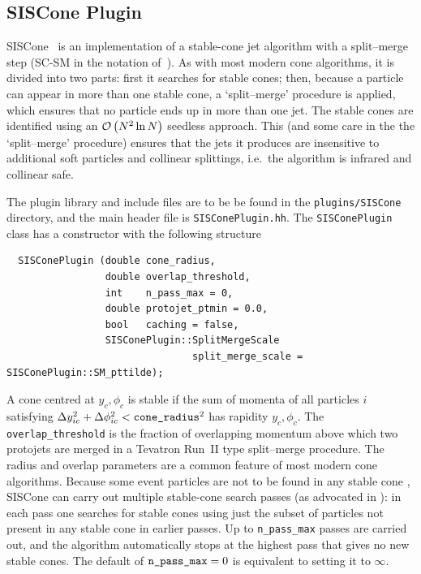 \documentclass[12pt,a4]{article}
\newcommand{\order}[1]{{\cal O}\left(#1\right)}
\begin{document}
\subsection{SISCone Plugin}
\label{sec:siscone-plugin}

SISCone~\cite{SISCone} is an implementation of a stable-cone jet
algorithm with a split--merge step (SC-SM in the notation
of~\cite{Salam:2009jx}).
%
As with most modern cone algorithms, it is divided into two parts:
first it searches for stable cones; then, because a particle can
appear in more than one stable cone, a `split--merge' procedure is
applied, which ensures that no particle ends up in more than one jet.
The stable cones are identified using an $\order{N^2 \ln N}$ seedless
approach. This (and some care in the the `split--merge' procedure)
ensures that the jets it produces are insensitive to additional soft
particles and collinear splittings, i.e.\ the algorithm is infrared
and collinear safe.

The plugin library and include files are to be be found in the
\verb:plugins/SISCone: directory, and the main header file is
\verb:SISConePlugin.hh:. The \verb:SISConePlugin: class has a
constructor with the following structure
\begin{lstlisting}
  SISConePlugin (double cone_radius,
                 double overlap_threshold,
                 int    n_pass_max = 0,
                 double protojet_ptmin = 0.0, 
                 bool   caching = false,
                 SISConePlugin::SplitMergeScale   
                                split_merge_scale = SISConePlugin::SM_pttilde);
\end{lstlisting}
A cone centred at $y_c,\phi_c$ is stable if the sum of momenta of all
particles $i$ satisfying $\Delta y_{ic}^2 + \Delta \phi_{ic}^2 <
\verb:cone_radius:^2$ has rapidity $y_c,\phi_c$.
%
The \verb:overlap_threshold: is the fraction of overlapping momentum
above which two protojets are merged in a Tevatron Run~II type
\cite{RunII-jet-physics} split--merge procedure.
The
radius and overlap parameters are a common feature of most modern cone
algorithms. Because some event particles are not to be found in any
stable cone \cite{EHT}, SISCone can carry out multiple stable-cone
search passes (as advocated in \cite{TeV4LHC}): in each pass one
searches for stable cones using just the subset of particles not
present in any stable cone in earlier passes. Up to \verb:n_pass_max:
passes are carried out, and the algorithm automatically stops at the
highest pass that gives no new stable cones. The default of
$\verb:n_pass_max: = 0$ is equivalent to setting it to $\infty$.
\end{document}
